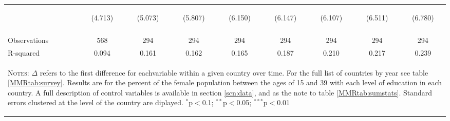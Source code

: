 \begin{landscape}
\begin{table}[htpb!]
\begin{center}
\begin{tabular}{lcccccccc}
&\begin{footnotesize}(4.713)\end{footnotesize}&\begin{footnotesize}(5.073)\end{footnotesize}&\begin{footnotesize}(5.807)\end{footnotesize}&\begin{footnotesize}(6.150)\end{footnotesize}&\begin{footnotesize}(6.147)\end{footnotesize}&\begin{footnotesize}(6.107)\end{footnotesize}&\begin{footnotesize}(6.511)\end{footnotesize}&\begin{footnotesize}(6.780)\end{footnotesize}\\
&&&&&&&&\\
Observations&568&294&294&294&294&294&294&294\\
R-squared&0.094&0.161&0.162&0.165&0.187&0.210&0.217&0.239\\
\midrule
\multicolumn{9}{p{20cm}}{\begin{footnotesize}\textsc{Notes:} $\Delta$ refers to the first difference for eachvariable within a given country over time. For the full list of countries by year see table \ref{MMRtab:survey}.  Results are for the percent of the female population between the ages of  15 and 39 with each level of education in each country.  A full description of control variables is available in section \ref{scn:data}, and as the note to table \ref{MMRtab:sumstats}.  Standard errors clustered at the level of the country are diplayed.
$^{*}$p$<$0.1; $^{**}$p$<$0.05; $^{***}$p$<$0.01\end{footnotesize}} \\ \bottomrule 
\end{tabular}\end{center}\end{table}\end{landscape}